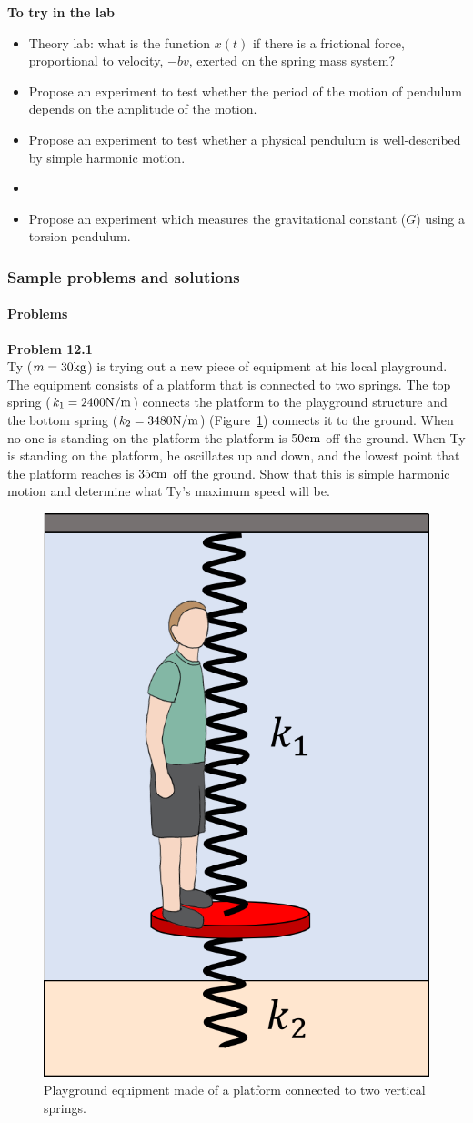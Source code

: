 \begin{framed}
\textbf{To try in the lab}\\
\begin{itemize}
\item Theory lab: what is the function $x(t)$ if there is a frictional force, proportional to velocity, $-bv$, exerted on the spring mass system?
\item Propose an experiment to test whether the period of the motion of pendulum depends on the amplitude of the motion.
\item Propose an experiment to test whether a physical pendulum is well-described by simple harmonic motion.
\item 
\item Propose an experiment which measures the gravitational constant ($G$) using a torsion pendulum.
\end{itemize}
\end{framed}

\subsubsection{Sample problems and solutions}

\paragraph{Problems}

\begin{framed}
\textbf{Problem 12.1}\\
Ty ($m=30 {\rm kg}$) is trying out a new piece of equipment at his local playground. The equipment consists of a platform that is connected to two springs. The top spring ($k_1=2400 {\rm N/m}$) connects the platform to the playground structure and the bottom spring ($k_2=3480 {\rm N/m}$) (Figure~\ref{fig:simpleharmonicmotion:playground}) connects it to the ground. When no one is standing on the platform the platform is $50 {\rm cm}$ off the ground. When Ty is standing on the platform, he oscillates up and down, and the lowest point that the platform reaches is $35 {\rm cm}$ off the ground. Show that this is simple harmonic motion and determine what Ty's maximum speed will be.

\begin{figure}[!htbp]
\centering
\includegraphics[width=0.3\linewidth]{files/playground1-99f6e4f872192288a95a159682b17661.png}
\caption[]{Playground equipment made of a platform connected to two vertical springs.}
\label{fig:simpleharmonicmotion:playground}
\end{figure}
\end{framed}

